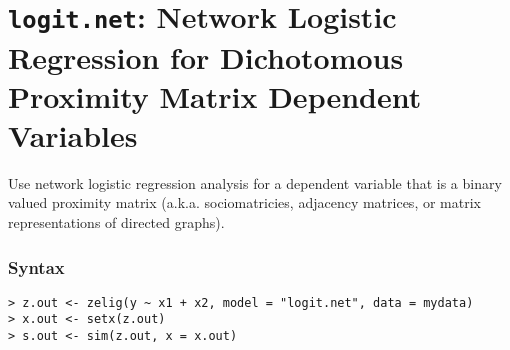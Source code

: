 \section{{\tt logit.net}: Network Logistic Regression for Dichotomous Proximity Matrix Dependent Variables}
\label{logit.net}

Use network logistic regression analysis for a dependent variable that is a binary valued proximity matrix (a.k.a. sociomatricies, adjacency matrices, or matrix representations of directed graphs). 

\subsubsection{Syntax}
\begin{verbatim}
> z.out <- zelig(y ~ x1 + x2, model = "logit.net", data = mydata) 
> x.out <- setx(z.out)
> s.out <- sim(z.out, x = x.out)
\end{verbatim}




